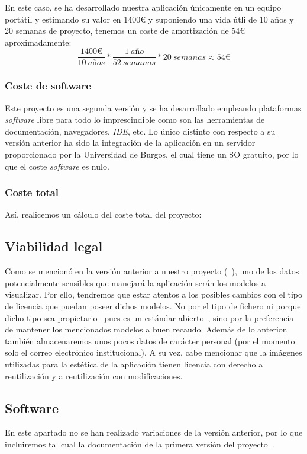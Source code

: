 En este caso, se ha desarrollado nuestra aplicación únicamente en un equipo portátil y estimando su valor en 1400\euro{} y suponiendo una vida útli de 10 años y 20 semanas de proyecto, tenemos un coste de amortización de 54\euro{} aproximadamente:
\[ \frac{1400\euro}{10 \ a\textit{ñ}os} * \frac{1 \ a\textit{ñ}o}{52 \ semanas} * 20 \ semanas \approx 54\euro \]

\subsubsection{Coste de software}
Este proyecto es una segunda versión y se ha desarrollado empleando plataformas \textit{software} libre para todo lo imprescindible como son las herramientas de documentación, navegadores, \textit{IDE}, etc. Lo único distinto con respecto a su versión anterior ha sido la integración de la aplicación en un servidor proporcionado por la Universidad de Burgos, el cual tiene un SO gratuito, por lo que el coste \textit{software} es nulo.

\subsubsection{Coste total}
Así, realicemos un cálculo del coste total del proyecto:

\subsection{Viabilidad legal}
Como se mencionó en la versión anterior a nuestro proyecto (~\cite{github:alberto-viewer}), uno de los datos potencialmente sensibles que manejará la aplicación serán los modelos a visualizar. Por ello, tendremos que estar atentos a los posibles cambios con el tipo de licencia que puedan poseer dichos modelos. No por el tipo de fichero ni porque dicho tipo sea propietario --pues es un estándar abierto--, sino por la preferencia de mantener los mencionados modelos a buen recaudo. Además de lo anterior, también almacenaremos unos pocos datos de carácter personal (por el momento solo el correo electrónico institucional).
A su vez, cabe mencionar que la imágenes utilizadas para la estética de la aplicación tienen licencia con derecho a reutilización y a reutilización con modificaciones.

\subsection{Software}
En este apartado no se han realizado variaciones de la versión anterior, por lo que incluiremos tal cual la documentación de la primera versión del proyecto~\cite{github:alberto-viewer}.

